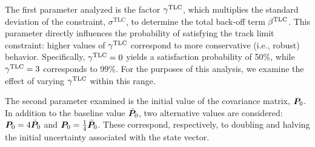 The first parameter analyzed is the factor $\gamma^\textrm{TLC}$, which multiplies the standard deviation of the constraint, $\sigma^\textrm{TLC}$, to determine the total back-off term $\beta^\textrm{TLC}$. This parameter directly influences the probability of satisfying the track limit constraint: higher values of $\gamma^\textrm{TLC}$ correspond to more conservative (i.e., robust) behavior. Specifically, $\gamma^\textrm{TLC} = 0$ yields a satisfaction probability of 50\%, while $\gamma^\textrm{TLC} = 3$ corresponds to 99\%. For the purposes of this analysis, we examine the effect of varying $\gamma^\textrm{TLC}$ within this range. 

The second parameter examined is the initial value of the covariance matrix, $\boldsymbol{P}_0$. In addition to the baseline value $\bar{\boldsymbol{P}}_0$, two alternative values are considered: $\boldsymbol{P}_0 = 4\bar{\boldsymbol{P}}_0$ and $\boldsymbol{P}_0 = \frac{1}{4}\bar{\boldsymbol{P}}_0$. These correspond, respectively, to doubling and halving the initial uncertainty associated with the state vector.

